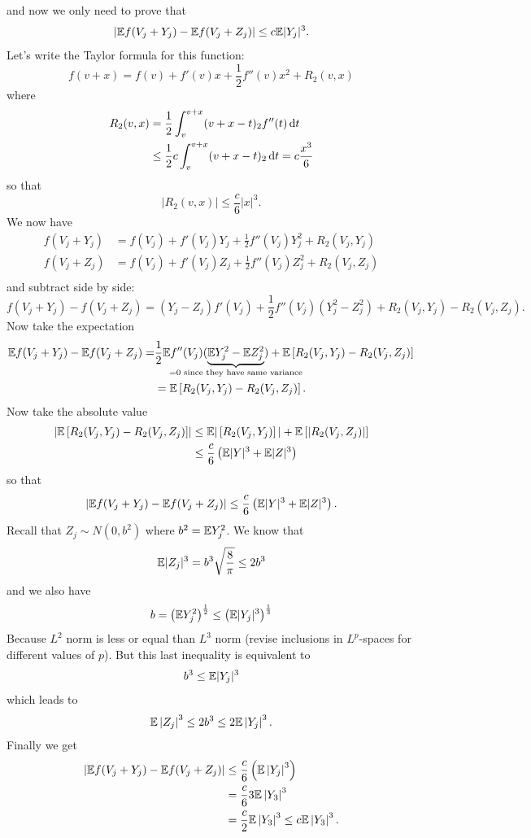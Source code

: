 \documentclass{report}
\begin{document}
\begin{fancyproof}
	and now we only need to prove that 
	\[\left|\mathbb{E} f(V_{j}+Y_{j})-\mathbb{E} f(V_j+Z_j)\right|\leq c\mathbb{E}|Y_{j}|^{3}.\]
	Let's write the Taylor formula for this function:
	\begin{equation*}
		f(v+x)=f(v)+f'(v)x+\frac{1}{2}f''(v)x^{2}+R_{2}(v,x)
	\end{equation*}
	where
	\begin{align*}
		R_{2}(v,x)&=\frac{1}{2}\int_{v}^{v+x}(v+x-t)_{2}f''(t)\mathop{}\!\mathrm{d} t\\
		&\leq \frac{1}{2}c\int_{v}^{v+x}(v+x-t)_{2}\mathop{}\!\mathrm{d} t=c\frac{x^{3}}{6}
	\end{align*}
	so that
	\[|	R_{2}(v,x)|\leq\frac{c}{6}|x|^{3}.\]
	We now have
	\begin{align*}
		f(V_j+Y_j)&=f(V_j)+f'(V_j)Y_j+\frac{1}{2}f''(V_{j})Y_{j}^{2}+R_2(V_j,Y_j)\\
		f(V_j+Z_j)&=f(V_j)+f'(V_j)Z_j+\frac{1}{2}f''(V_{j})Z_{j}^{2}+R_2(V_j,Z_j)\\
	\end{align*}
	and subtract side by side:
	\begin{equation*}
		f(V_j+Y_j)-f(V_j+Z_j)=(Y_j-Z_j)f'(V_j)+\frac{1}{2}f''(V_j)(Y^{2}_{j}-Z^{2}_{j})+R_2(V_{j},Y_{j})-R_2(V_{j},Z_{j}).
	\end{equation*}
	Now take the expectation 
	\begin{align*}
		\ev f(V_j+Y_j)-\ev f(V_j+Z_j)=&\frac{1}{2}\ev f''(V_j)(\underbrace{\ev Y^{2}_{j}-\ev Z^{2}_{j}}_{\mathclap{=0\text{ since they have same variance}}})+\ev\left[R_2(V_{j},Y_{j})-R_2(V_{j},Z_{j})\right]\\
		&=\ev\left[R_2(V_{j},Y_{j})-R_2(V_{j},Z_{j})\right].
	\end{align*}
	Now take the absolute value
	\begin{align*}
		\left|\mathbb{E}\left[R_2(V_{j},Y_{j})-R_2(V_{j},Z_{j})\right]\right|&\leq\mathbb{E}|\left[R_2(V_{j},Y_{j})\right]|+\mathbb{E}\left[|R_2(V_{j},Z_{j})|\right]\\
		&\leq\frac{c}{6}\left(\mathbb{E}|Y|^{3}+\mathbb{E}|Z|^{3}\right)
	\end{align*}
	so that 
	\begin{equation*}
		|	\mathbb{E} f(V_j+Y_j)-\mathbb{E} f(V_j+Z_j)|\leq\frac{c}{6}\left(\mathbb{E}|Y|^{3}+\mathbb{E}|Z|^{3}\right).
	\end{equation*}
	Recall that $Z_j\sim N(0,b^{2})$ where $b^{2}=\mathbb{E} Y^{2}_{j}$. We know that
	\[\mathbb{E}|Z_j|^{3}=b^{3}\sqrt{\frac{8}{\pi}}\leq 2b^{3}\]
	and we also have 
	\[b=\left(\mathbb{E} Y^{2}_{j}\right)^{\frac{1}{2}}\leq\left(\mathbb{E} |Y_{j}|^{3}\right)^{\frac{1}{3}}\]
	Because $L^{2}$ norm is less or equal than $L^{3}$ norm (revise inclusions in $L^{p}$-spaces for different values of $p$). But this last inequality is equivalent to
	\[b^{3}\leq\mathbb{E}|Y_{j}|^{3}\]
	which leads to
	\[\mathbb{E}\left|Z_j\right|^{3}\leq2 b^{3}\leq2\mathbb{E}\left|Y_j\right|^{3}.\]
	Finally we get
	\begin{align*}
		\left|\mathbb{E} f(V_j+Y_j)-\mathbb{E} f(V_j+Z_j)\right|&\leq\frac{c}{6}\left(\mathbb{E}\left|Y_j\right|^{3}\right)\\
		&=\frac{c}{6}3\mathbb{E}\left|Y_{3}\right|^{3}\\
		&=\frac{c}{2}\mathbb{E}\left|Y_{3}\right|^{3}\leq c\mathbb{E}\left|Y_{3}\right|^{3}.\\
	\end{align*}
\end{fancyproof} 
\end{document}
